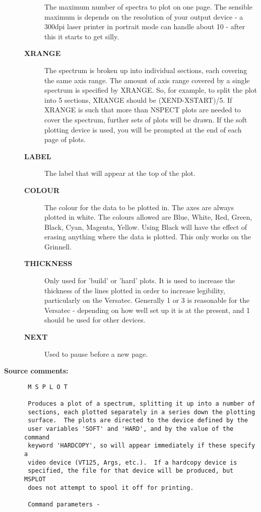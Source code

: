 \begin{description}
\begin{description}
 The maximum number of spectra to plot on
 one page.  The sensible maximum is depends on the resolution of your
 output device - a 300dpi laser printer in portrait mode can handle
 about 10 - after this it starts to get silly.
\item [{\bf XRANGE}]
 The spectrum is broken up into individual sections, each covering the
 same axis range.  The amount of axis range covered by a single
 spectrum is specified by XRANGE.  So, for example, to split the plot
 into 5 sections, XRANGE should be (XEND-XSTART)/5.  If XRANGE is such
 that more than NSPECT plots are needed to cover the spectrum, further
 sets of plots will be drawn.  If the soft plotting device is used,
 you will be prompted at the end of each page of plots.
\item [{\bf LABEL}]
 The label that will appear at the top of the plot.
\item [{\bf COLOUR}]
 The colour for the data to be plotted in.
 The axes are always plotted in white.  The colours allowed are Blue,
 White, Red, Green, Black, Cyan, Magenta, Yellow.  Using Black will
 have the effect of erasing anything where the data is plotted.  This
 only works on the Grinnell.
\item [{\bf THICKNESS}]
 Only used for 'build' or 'hard' plots.  It is used to
 increase the thickness of the lines plotted in order to increase
 legibility, particularly on the Versatec.  Generally 1 or 3 is
 reasonable for the Versatec - depending on how well set up it is at
 the present, and 1 should be used for other devices.
\item [{\bf NEXT}]
 Used to pause before a new page.
\end{description}

\item [{\bf Source comments:}]
\begin{verbatim}
 M S P L O T

 Produces a plot of a spectrum, splitting it up into a number of
 sections, each plotted separately in a series down the plotting
 surface.  The plots are directed to the device defined by the
 user variables 'SOFT' and 'HARD', and by the value of the command
 keyword 'HARDCOPY', so will appear immediately if these specify a
 video device (VT125, Args, etc.).  If a hardcopy device is
 specified, the file for that device will be produced, but MSPLOT
 does not attempt to spool it off for printing.

 Command parameters -


\end{verbatim}
\end{description}
